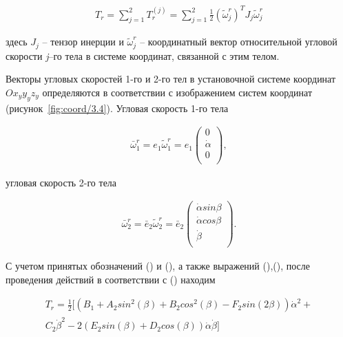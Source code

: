 \begin{equation}
\label{eq:p3:8}
\begin{alignedat}{2}
T_{r}= 
\sum_{j=1}^{2}T_{r}^{ \left( j \right) }= 
\sum_{j=1}^{2}\frac{1}{2} \left( \tilde{\omega}_{j}^{r} \right) ^{T}J_{j} \tilde{\omega}_{j}^{r}
\end{alignedat}
\end{equation}

здесь 
\( J_{j} \) – тензор инерции и 
\( \tilde{\omega}_{j}^{r} \) – координатный вектор относительной угловой скорости \textit{j}–го тела в системе координат, связанной с этим телом. 


Векторы угловых скоростей 1-го и 2-го тел в установочной системе координат \( Ox_{y}y_{y}z_{y} \) определяются в соответствии с изображением систем координат (рисунок~\ref{fig:coord/3.4}). Угловая скорость 1-го тела 

\begin{equation}
\label{eq:p3:9}
\begin{alignedat}{2}
\bar{\omega}_{1}^{r}=e_{1} \tilde{\omega}_{1}^{r}=e_{1} \left( \begin{matrix}
0\\
\dot{\alpha} \\
0\\
\end{matrix}
\right),
\end{alignedat}
\end{equation}

угловая скорость 2-го тела 

\begin{equation}
\label{eq:p3:10}
\begin{alignedat}{2}
 \bar{\omega}_{2}^{r}=\bar{e}_{2} \tilde{\omega}_{2}^{r}=\bar{e}_{2} \left( \begin{matrix}
\dot{\alpha} sin \beta \\
\dot{\alpha} cos \beta \\
\dot{\beta} \\
\end{matrix}
\right) .
\end{alignedat}
\end{equation}

С учетом принятых обозначений () и (), а также выражений (),(), после проведения действий в соответствии с () находим 

\begin{equation}
\label{eq:p3:11}
\begin{alignedat}{2}
T_{r}=
\frac{1}{2} 
[ 
	( 
		B_{1}+
		A_{2}sin^{2} ( \beta ) +
		B_{2}cos^{2} ( \beta ) -
		F_{2}sin ( 2 \beta ) 
	) \dot{\alpha}^{2} + \\
	C_{2} \dot{\beta}^{2} - 
	2 ( 
		E_{2}sin ( \beta ) +
		D_{2}cos ( \beta ) 
	) 
	\dot{\alpha} \dot{\beta} 
] 
\end{alignedat}
\end{equation}

